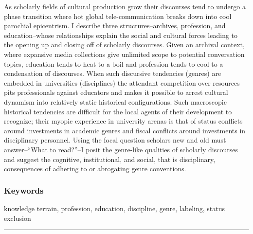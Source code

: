 \documentclass[]{book}
\theoremstyle{definition}
\theoremstyle{definition}
\theoremstyle{definition}
\theoremstyle{remark}
\begin{document}
As scholarly fields of cultural production grow their
discourses tend to undergo a phase transition where hot global
tele-communication breaks down into cool parochial epicentrism. I
describe three structures--archives, profession, and education--whose
relationships explain the social and cultural forces leading to the
opening up and closing off of scholarly discourses. Given an archival
context, where expansive media collections give unlimited scope to
potential conversation topics, education tends to heat to a boil and
profession tends to cool to a condensation of discourses. When such
discursive tendencies (genres) are embedded in universities
(disciplines) the attendant competition over resources pits
professionals against educators and makes it possible to arrest cultural
dynamism into relatively static historical configurations. Such
macroscopic historical tendencies are difficult for the local agents of
their development to recognize; their myopic experience in university
arenas is that of status conflicts around investments in academic genres
and fiscal conflicts around investments in disciplinary personnel. Using
the focal question scholars new and old must answer--``What to
read?''--I posit the genre-like qualities of scholarly discourses and
suggest the cognitive, institutional, and social, that is disciplinary,
consequences of adhering to or abrogating genre conventions.

\hypertarget{keywords}{%
\subsubsection*{Keywords}\label{keywords}}


knowledge terrain, profession, education, discipline,
genre, labeling, status exclusion

\begin{center}\rule{0.5\linewidth}{\linethickness}\end{center}
\end{document}
